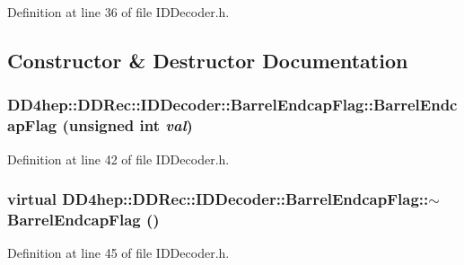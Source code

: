 Definition at line 36 of file IDDecoder.h.

\subsection{Constructor \& Destructor Documentation}
\hypertarget{class_d_d4hep_1_1_d_d_rec_1_1_i_d_decoder_1_1_barrel_endcap_flag_acecd6351bd9d45414c9689c222eb719b}{
\subsubsection[{BarrelEndcapFlag}]{\setlength{\rightskip}{0pt plus 5cm}DD4hep::DDRec::IDDecoder::BarrelEndcapFlag::BarrelEndcapFlag (unsigned int {\em val})}}
\label{class_d_d4hep_1_1_d_d_rec_1_1_i_d_decoder_1_1_barrel_endcap_flag_acecd6351bd9d45414c9689c222eb719b}


Definition at line 42 of file IDDecoder.h.\hypertarget{class_d_d4hep_1_1_d_d_rec_1_1_i_d_decoder_1_1_barrel_endcap_flag_a49909f06796881e12c94f8a545f19e28}{
\subsubsection[{$\sim$BarrelEndcapFlag}]{\setlength{\rightskip}{0pt plus 5cm}virtual DD4hep::DDRec::IDDecoder::BarrelEndcapFlag::$\sim$BarrelEndcapFlag ()}}
\label{class_d_d4hep_1_1_d_d_rec_1_1_i_d_decoder_1_1_barrel_endcap_flag_a49909f06796881e12c94f8a545f19e28}


Definition at line 45 of file IDDecoder.h.

